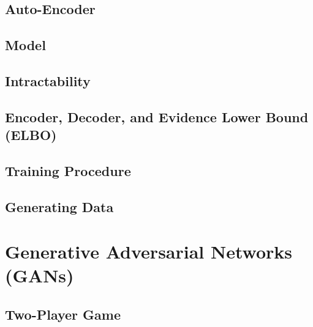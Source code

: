 		\subsection{Auto-Encoder} %

		\subsection{Model} %

		\subsection{Intractability} %

		\subsection{Encoder, Decoder, and Evidence Lower Bound (ELBO)} %

		\subsection{Training Procedure} %

		\subsection{Generating Data} %

	\section{Generative Adversarial Networks (GANs)} %

		\subsection{Two-Player Game} %

